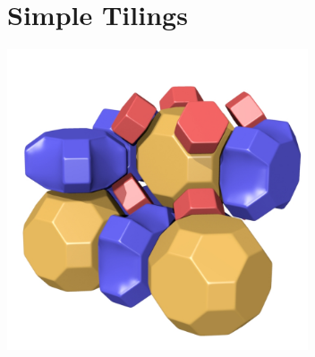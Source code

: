 \documentclass{beamer}
\begin{document}
\section{Simple Tilings}

\begin{frame}
  \begin{center}
    \includegraphics[width=3.5in]{simple8}
  \end{center}
\end{frame}
\end{document}
